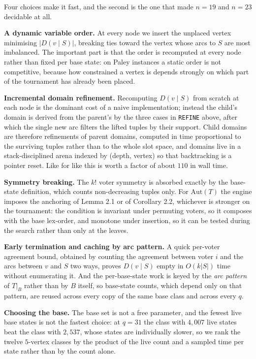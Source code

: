 \documentclass[
]{article}
\begin{document}
Four choices make it fast, and the second is the one that made
\(n = 19\) and \(n = 23\) decidable at all.

\textbf{A dynamic variable order.} At every node we insert the unplaced
vertex minimising \(|D(v \mid S)|\), breaking ties toward the vertex
whose arcs to \(S\) are most imbalanced. The important part is that the
order is recomputed at every node rather than fixed per base state: on
Paley instances a static order is not competitive, because how
constrained a vertex is depends strongly on which part of the tournament
has already been placed.

\textbf{Incremental domain refinement.} Recomputing \(D(v \mid S)\) from
scratch at each node is the dominant cost of a naive implementation;
instead the child's domain is derived from the parent's by the three
cases in \texttt{REFINE} above, after which the single new arc filters
the lifted tuples by their support. Child domains are therefore
refinements of parent domains, computed in time proportional to the
surviving tuples rather than to the whole slot space, and domains live
in a stack-disciplined arena indexed by (depth, vertex) so that
backtracking is a pointer reset. Like for like this is worth a factor of
about \(110\) in wall time.

\textbf{Symmetry breaking.} The \(k!\) voter symmetry is absorbed
exactly by the base-state definition, which counts non-decreasing tuples
only. For \(\mathrm{Aut}(T)\) the engine imposes the anchoring of Lemma
2.1 or of Corollary 2.2, whichever is stronger on the tournament: the
condition is invariant under permuting voters, so it composes with the
base lex-order, and monotone under insertion, so it can be tested during
the search rather than only at the leaves.

\textbf{Early termination and caching by arc pattern.} A quick per-voter
agreement bound, obtained by counting the agreement between voter \(i\)
and the arcs between \(v\) and \(S\) two ways, proves \(D(v \mid S)\)
empty in \(O(k|S|)\) time without enumerating it. And the per-base-state
work is keyed by the \emph{arc pattern} of \(T|_B\) rather than by \(B\)
itself, so base-state counts, which depend only on that pattern, are
reused across every copy of the same base class and across every \(q\).

\textbf{Choosing the base.} The base set is not a free parameter, and
the fewest live base states is not the fastest choice: at \(q = 31\) the
class with \(4{,}007\) live states beat the class with \(2{,}537\),
whose states are individually slower, so we rank the twelve \(5\)-vertex
classes by the product of the live count and a sampled time per state
rather than by the count alone.
\end{document}
